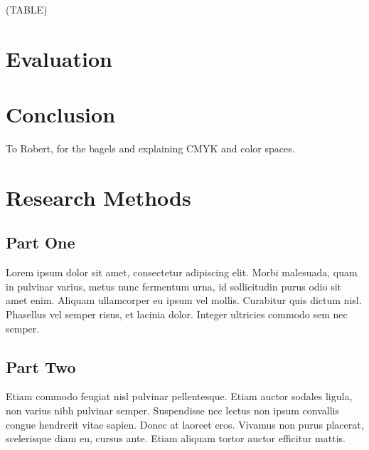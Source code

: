 \documentclass[sigconf]{acmart}
\begin{document}
(TABLE)





\section{Evaluation}


\section{Conclusion}

\begin{acks}
To Robert, for the bagels and explaining CMYK and color spaces.
\end{acks}





\appendix

\section{Research Methods}

\subsection{Part One}

Lorem ipsum dolor sit amet, consectetur adipiscing elit. Morbi
malesuada, quam in pulvinar varius, metus nunc fermentum urna, id
sollicitudin purus odio sit amet enim. Aliquam ullamcorper eu ipsum
vel mollis. Curabitur quis dictum nisl. Phasellus vel semper risus, et
lacinia dolor. Integer ultricies commodo sem nec semper.

\subsection{Part Two}

Etiam commodo feugiat nisl pulvinar pellentesque. Etiam auctor sodales
ligula, non varius nibh pulvinar semper. Suspendisse nec lectus non
ipsum convallis congue hendrerit vitae sapien. Donec at laoreet
eros. Vivamus non purus placerat, scelerisque diam eu, cursus
ante. Etiam aliquam tortor auctor efficitur mattis.
\end{document}
